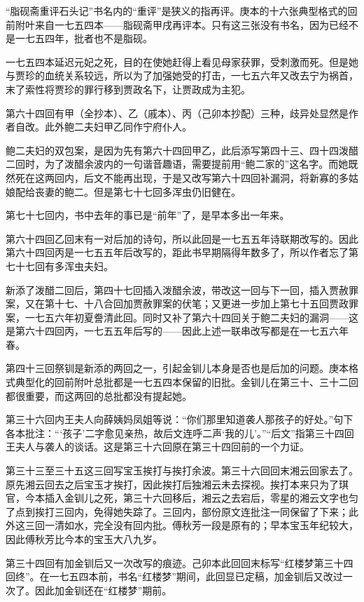 \par “脂砚斋重评石头记”书名内的“重评”是狭义的指再评。庚本的十六张典型格式的回前附叶来自一七五四本——脂砚斋甲戌再评本。只有这三张没有书名，因为已经不是一七五四年，批者也不是脂砚。
\par 一七五四本延迟元妃之死，目的在使她赶得上看见母家获罪，受刺激而死。但是她与贾珍的血统关系较远，所以为了加强她受的打击，一七五六年又改去宁为祸首，末了索性将贾珍的罪行移到贾政名下，让贾政成为主犯。
\par 第六十四回有甲（全抄本）、乙（戚本）、丙（己卯本抄配）三种，歧异处显然是作者自改。此外鲍二夫妇甲乙同作宁府仆人。
\par 鲍二夫妇的双包案，是因为先有第六十四回甲乙，此后添写第四十三、四十四泼醋二回时，为了泼醋余波内的一句谐音趣语，需要提前用“鲍二家的”这名字。而她既然死在这两回内，后文不能再出现，于是又改写第六十四回补漏洞，将新寡的多姑娘配给丧妻的鲍二。但是第七十七回多浑虫仍旧健在。
\par 第七十七回内，书中去年的事已是“前年”了，是早本多出一年来。
\par 第六十四回乙回末有一对后加的诗句，所以此回是一七五五年诗联期改写的。因此第六十四回丙是一七五五年后改写的，距此书早期隔得年数多了，所以作者忘了第七十七回有多浑虫夫妇。
\par 新添了泼醋二回后，第四十七回插入泼醋余波，带改这一回与下一回，插入贾赦罪案，又在第十七、十八合回加贾赦罪案的伏笔；又更进一步加上第七十五回贾政罪案，一七五六年初夏誊清此回。同时又补了第六十四回关于鲍二夫妇的漏洞——这是第六十四回丙，一七五五年后写的——因此上述一联串改写都是在一七五六年春。
\par 第四十三回祭钏是新添的两回之一，引起金钏儿本身是否也是后加的问题。庚本格式典型化的回前附叶总批都是一七五四本保留的旧批。金钏儿在第三十、三十二回都很重要，而这两回的总批都没有提起她。
\par 第三十六回内王夫人向薛姨妈凤姐等说：“你们那里知道袭人那孩子的好处。”句下各本批注：“‘孩子’二字愈见亲热，故后文连呼二声‘我的儿’。”“后文”指第三十四回王夫人与袭人的谈话。这是第三十六回原在第三十四回前的一个力证。
\par 第三十三至三十五这三回写宝玉挨打与挨打余波。第三十六回回末湘云回家去了。原先湘云回去之后宝玉才挨打，因此挨打后独湘云未去探视。挨打本来只为了琪官，今本插入金钏儿之死，第三十六回移后，湘云之去宕后，零星的湘云文字也匀了点到挨打三回内，免得她失踪了。三回内，部份原文连批注一同保留了下来；此外这三回一清如水，完全没有回内批。傅秋芳一段是原有的；早本宝玉年纪较大，因此傅秋芳比今本的宝玉大八九岁。
\par 第三十四回有加金钏后又一次改写的痕迹。己卯本此回回末标写“红楼梦第三十四回终”。在一七五四本前，书名“红楼梦”期间，此回显已定稿，加金钏后又改过一次了。因此加金钏还在“红楼梦”期前。
